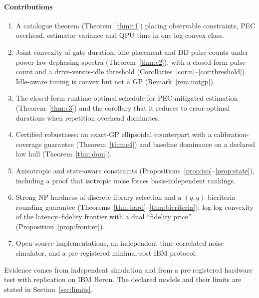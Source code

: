 \documentclass[10pt,journal]{IEEEtran}
\theoremstyle{remark}
\begin{document}
\paragraph*{Contributions}
\begin{enumerate}
\item A catalogue theorem (Theorem~\ref{thm:c1}) placing observable constraints, PEC overhead, estimator
variance and QPU time in one log-convex class.
\item Joint convexity of gate duration, idle placement and DD pulse counts under power-law dephasing spectra
(Theorem~\ref{thm:c2}), with a closed-form pulse count and a drive-versus-idle threshold
(Corollaries~\ref{cor:n}--\ref{cor:threshold}). Idle-aware timing is convex but not a GP (Remark~\ref{rem:notgp}).
\item The closed-form runtime-optimal schedule for PEC-mitigated estimation (Theorem~\ref{thm:c3}) and the
corollary that it reduces to error-optimal durations when repetition overhead dominates.
\item Certified robustness: an exact-GP ellipsoidal counterpart with a calibration-coverage guarantee
(Theorem~\ref{thm:c4}) and baseline dominance on a declared law hull (Theorem~\ref{thm:dom}).
\item Anisotropic and state-aware constraints (Propositions~\ref{prop:iso}--\ref{prop:state}), including a proof
that isotropic noise forces basis-independent rankings.
\item Strong NP-hardness of discrete library selection and a $(q,q)$-bicriteria rounding guarantee
(Theorems~\ref{thm:hard}--\ref{thm:bicriteria}); log-log convexity of the latency--fidelity frontier with a dual
``fidelity price'' (Proposition~\ref{prop:frontier}).
\item Open-source implementations, an independent time-correlated noise simulator, and a pre-registered
minimal-cost IBM protocol.
\end{enumerate}
Evidence comes from independent simulation and from a pre-registered hardware test with replication on IBM
Heron. The declared models and their limits are stated in Section~\ref{sec:limits}.
\end{document}
